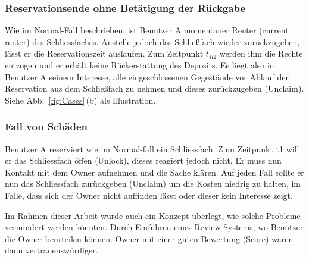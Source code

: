 \subsubsection{Reservationsende ohne Betätigung der Rückgabe}
Wie im Normal-Fall beschrieben, ist Benutzer A momentaner Renter (current renter) des Schliessfaches. Anstelle jedoch das Schließfach wieder zurückzugeben, lässt er die Reservationszeit auslaufen. Zum Zeitpunkt $t_{R2}$ werden ihm die Rechte entzogen und er erhält keine Rückerstattung des Deposits. Es liegt also in Benutzer A seinem Interesse, alle eingeschlossenen Gegestände vor Ablauf der Reservation aus dem Schließfach zu nehmen und dieses zurückzugeben (Unclaim). Siehe Abb.~\ref{fig:Cases}\,(b) als Illustration.

\subsubsection{Fall von Schäden}
Benutzer A reserviert wie im Normal-fall ein Schliessfach. Zum Zeitpunkt t1 will er das Schliessfach öffen (Unlock), dieses reagiert jedoch nicht. Er muss nun Kontakt mit dem Owner aufnehmen und die Sache klären. Auf jeden Fall sollte er nun das Schliessfach zurückgeben (Unclaim) um die Kosten niedrig zu halten, im Falle, dass sich der Owner nicht auffinden lässt oder dieser kein Interesse zeigt.

Im Rahmen dieser Arbeit wurde auch ein Konzept überlegt, wie solche Probleme vermindert werden könnten. Durch Einführen eines Review Systems, wo Benutzer die Owner beurteilen können. Owner mit einer guten Bewertung (Score) wären dann vertrauenswürdiger.
